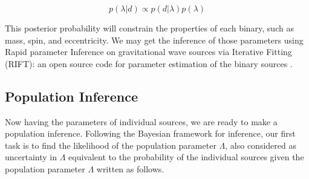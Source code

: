 \documentclass[twocolumn,prd,nofootinbib]{revtex4}
\begin{document}
\begin{equation}
\label{eq:Bayes_ind}    
p(\lambda|d) \propto p(d|\lambda) p(\lambda)
\end{equation}

This posterior probability will constrain the properties of each binary, such as mass, spin, and eccentricity. We may get the inference of those parameters using Rapid parameter Inference on gravitational wave sources via Iterative Fitting (RIFT): an open source code for parameter estimation of the binary sources \cite{rift_2018}.



    


\subsection{Population Inference}

Now having the parameters of individual sources, we are ready to make a population inference. Following the Bayesian framework for inference, our first task is to find the likelihood of the population parameter $\Lambda$, also considered as uncertainty in $\Lambda$ equivalent to the probability of the individual sources given the population parameter $\Lambda$ written as follows. 
\end{document}

